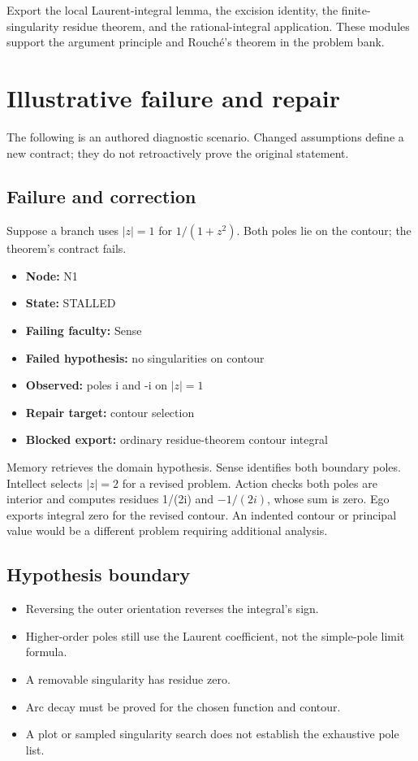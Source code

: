 \documentclass[preprint,12pt,aps,pra,showkeys,amsmath,amssymb,superscriptaddress,floatfix]{revtex4-2}
\theoremstyle{definition}
\theoremstyle{remark}
\providecommand{\tightlist}{\setlength{\itemsep}{2pt}\setlength{\parskip}{0pt}}
\begin{document}
Export the local Laurent-integral lemma, the excision identity, the
finite-singularity residue theorem, and the rational-integral
application. These modules support the argument principle and Rouché's
theorem in the problem bank.

\section{Illustrative failure and repair}

The following is an authored diagnostic scenario. Changed assumptions
define a new contract; they do not retroactively prove the original
statement.

\subsection{Failure and correction}
Suppose a branch uses \(|z|=1\) for \(1/(1+z^{2})\). Both poles lie on
the contour; the theorem's contract fails.

\begin{itemize}
\item
  \textbf{Node:} N1
\item
  \textbf{State:} STALLED
\item
  \textbf{Failing faculty:} Sense
\item
  \textbf{Failed hypothesis:} no singularities on contour
\item
  \textbf{Observed:} poles i and -i on \(|z|=1\)
\item
  \textbf{Repair target:} contour selection
\item
  \textbf{Blocked export:} ordinary residue-theorem contour integral
\end{itemize}

Memory retrieves the domain hypothesis. Sense identifies both boundary
poles. Intellect selects \(|z|=2\) for a revised problem. Action checks
both poles are interior and computes residues 1/(2i) and \(-1/(2i)\),
whose sum is zero. Ego exports integral zero for the revised contour. An
indented contour or principal value would be a different problem
requiring additional analysis.

\subsection{Hypothesis boundary}
\begin{itemize}
\tightlist
\item
  Reversing the outer orientation reverses the integral's sign.
\item
  Higher-order poles still use the Laurent coefficient, not the
  simple-pole limit formula.
\item
  A removable singularity has residue zero.
\item
  Arc decay must be proved for the chosen function and contour.
\item
  A plot or sampled singularity search does not establish the exhaustive
  pole list.
\end{itemize}
\end{document}
